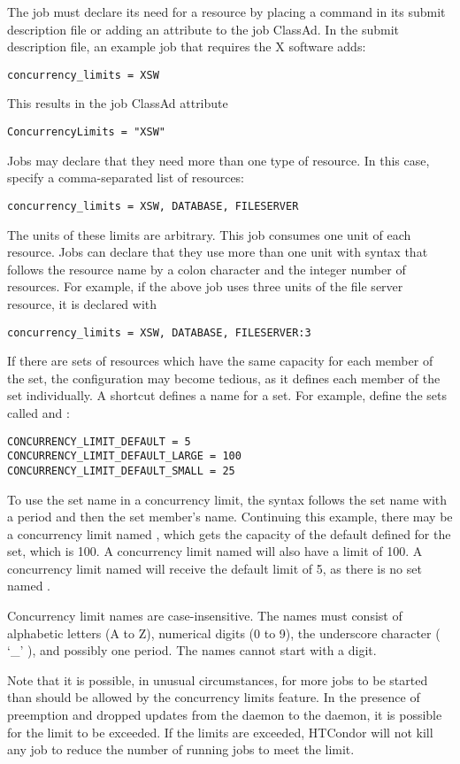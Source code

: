 The job must declare its need for a resource by placing a command
in its submit description file or adding an attribute to the
job ClassAd.
In the submit description file, an example job that requires
the X software adds:
\begin{verbatim}
concurrency_limits = XSW
\end{verbatim}
This results in the job ClassAd attribute
\begin{verbatim}
ConcurrencyLimits = "XSW"
\end{verbatim}

Jobs may declare that they need more than one type of resource.
In this case, specify a comma-separated list of resources:

\begin{verbatim}
concurrency_limits = XSW, DATABASE, FILESERVER
\end{verbatim}

The units of these limits are arbitrary. 
This job consumes one unit of each resource.
Jobs can declare that they use more than one unit with syntax
that follows the resource name by a colon character and the
integer number of resources.  
For example, if the above job uses three units of the file server resource,
it is declared with

\begin{verbatim}
concurrency_limits = XSW, DATABASE, FILESERVER:3
\end{verbatim}

If there are sets of resources which have the same
capacity for each member of the set,
the configuration may become tedious,
as it defines each member of the set individually.
A shortcut defines a name for a set.
For example, define the sets called  and :

\begin{verbatim}
CONCURRENCY_LIMIT_DEFAULT = 5
CONCURRENCY_LIMIT_DEFAULT_LARGE = 100
CONCURRENCY_LIMIT_DEFAULT_SMALL = 25
\end{verbatim}

To use the set name in a concurrency limit,
the syntax follows the set name with a period and then the set member's
name.
Continuing this example, 
there may be a concurrency limit named ,
which gets the capacity of the default defined for the
 set, which is 100. 
A concurrency limit named  will
also have a limit of 100.
A concurrency limit named
 will receive the default limit of 5, as
there is no set named .

Concurrency limit names are case-insensitive.
The names must consist of alphabetic letters (A to Z), numerical digits
(0 to 9), the underscore character ( `\_' ), and possibly one period.
The names cannot start with a digit.

Note that it is possible, in unusual circumstances, for more jobs to
be started than should be allowed by the concurrency limits feature.
In the presence of preemption and dropped updates from the
 daemon to the  daemon, it is
possible for the limit to be exceeded. If the limits are exceeded,
HTCondor will not kill any job to reduce the number of running jobs to
meet the limit.
